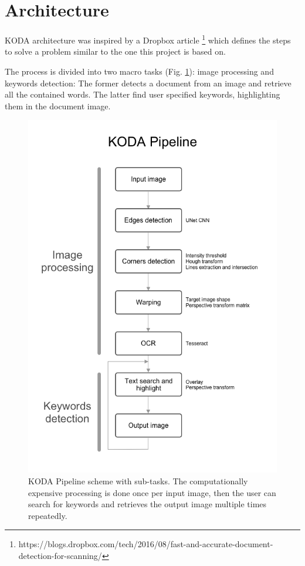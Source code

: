 \documentclass[a4paper]{article}
\begin{document}
\section{Architecture}

KODA architecture was inspired by a Dropbox article \footnote{https://blogs.dropbox.com/tech/2016/08/fast-and-accurate-document-detection-for-scanning/} which defines the steps to solve a problem similar to the one this project is based on.

The process is divided into two macro tasks (Fig. \ref{fig:pipeline}): image processing and keywords detection: The former detects a document from an image and retrieve all the contained words. The latter find user specified keywords, highlighting them in the document image.

\begin{figure}[!htbp]
	\centering
	\includegraphics[width=0.8\linewidth]{Pipeline.png}
	\caption{KODA Pipeline scheme with sub-tasks. The computationally expensive processing is done once per input image, then the user can search for keywords and retrieves the output image multiple times repeatedly.}
	\label{fig:pipeline}
\end{figure}
\end{document}
